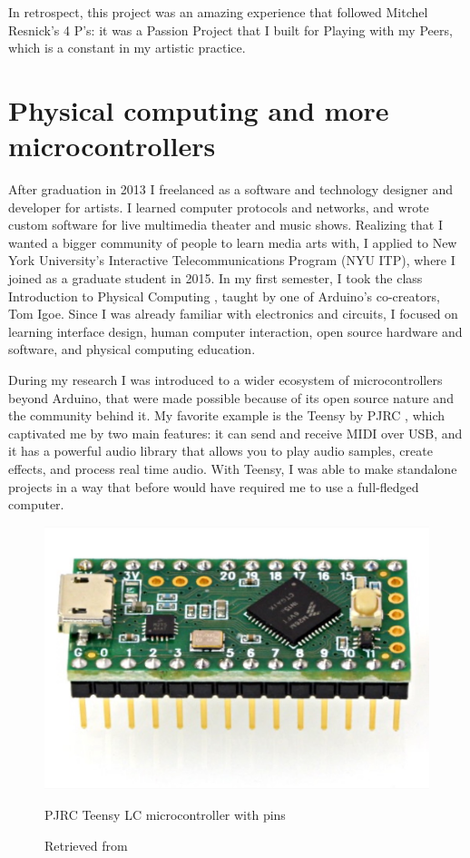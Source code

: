 In retrospect, this project was an amazing experience that followed Mitchel Resnick's 4 P's: it was a Passion Project that I built for Playing with my Peers, which is a constant in my artistic practice.

\section{Physical computing and more microcontrollers}

After graduation in 2013 I freelanced as a software and technology designer and developer for artists. I learned computer protocols and networks, and wrote custom software for live multimedia theater and music shows. Realizing that I wanted a bigger community of people to learn media arts with, I applied to New York University's Interactive Telecommunications Program (\acrshort{NYU} \acrshort{ITP}), where I joined as a graduate student in 2015. In my first semester, I took the class Introduction to Physical Computing \cite{website-nyu-itp-intro-physical-computing}, taught by one of Arduino's co-creators, Tom Igoe. Since I was already familiar with electronics and circuits, I focused on learning interface design, human computer interaction, open source hardware and software, and physical computing education.

During my research I was introduced to a wider ecosystem of microcontrollers beyond Arduino, that were made possible because of its open source nature and the community behind it. My favorite example is the Teensy by PJRC \cite{website-pjrc}, which captivated me by two main features: it can send and receive \acrshort{MIDI} over USB, and it has a powerful audio library that allows you to play audio samples, create effects, and process real time audio. With Teensy, I was able to make standalone projects in a way that before would have required me to use a full-fledged computer.

\begin{figure}[ht]
  \centering
  \includegraphics[width=0.75\linewidth,height=0.25\textheight,keepaspectratio]{images/pjrc-teensy-lc-with-pins.jpg}
  \caption{PJRC Teensy LC microcontroller with pins}
  \caption*{Retrieved from \cite{website-pjrc-teensy-lc-with-pins}}
  \label{fig:pjrc-teensy-lc-with-pins}
\end{figure}

